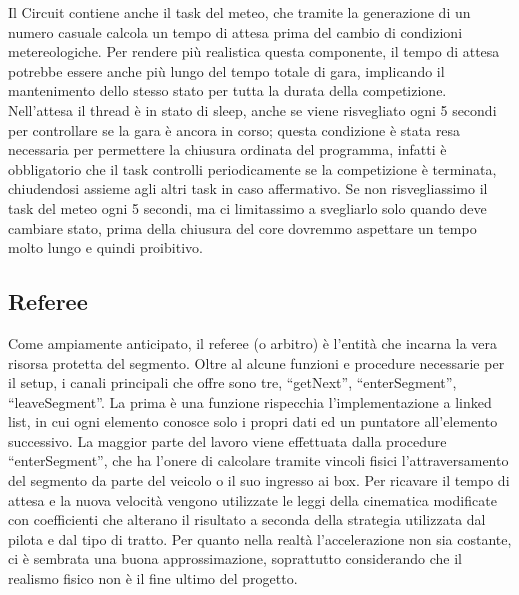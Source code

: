 Il Circuit contiene anche il task del meteo, che tramite la generazione di un numero casuale calcola un tempo di attesa prima del cambio di condizioni metereologiche. Per rendere più realistica questa componente, il tempo di attesa potrebbe essere anche più lungo del tempo totale di gara, implicando il mantenimento dello stesso stato per tutta la durata della competizione. Nell’attesa il thread è in stato di sleep, anche se viene risvegliato ogni 5 secondi per controllare se la gara è ancora in corso; questa condizione è stata resa necessaria per permettere la chiusura ordinata del programma, infatti è obbligatorio che il task controlli periodicamente se la competizione è terminata, chiudendosi assieme agli altri task in caso affermativo. Se non risvegliassimo il task del meteo ogni 5 secondi, ma ci limitassimo a svegliarlo solo quando deve cambiare stato, prima della chiusura del core dovremmo aspettare un tempo molto lungo e quindi proibitivo.

\subsection{Referee}

Come ampiamente anticipato, il referee (o arbitro) è l’entità che incarna la vera risorsa protetta del segmento. 
Oltre al alcune funzioni e procedure necessarie per il setup, i canali principali che offre sono tre, “getNext”, “enterSegment”, “leaveSegment”.
La prima è una funzione rispecchia l’implementazione a linked list, in cui ogni elemento conosce solo i propri dati ed un puntatore all’elemento successivo.
La maggior parte del lavoro viene effettuata dalla procedure “enterSegment”, che ha l’onere di calcolare tramite vincoli fisici l’attraversamento del segmento da parte del veicolo o il suo ingresso ai box.
Per ricavare il tempo di attesa e la nuova velocità vengono utilizzate le leggi della cinematica modificate con coefficienti che alterano il risultato a seconda della strategia utilizzata dal pilota e dal tipo di tratto. Per quanto nella realtà l’accelerazione non sia costante, ci è sembrata una buona approssimazione, soprattutto considerando che il realismo fisico non è il fine ultimo del progetto.

